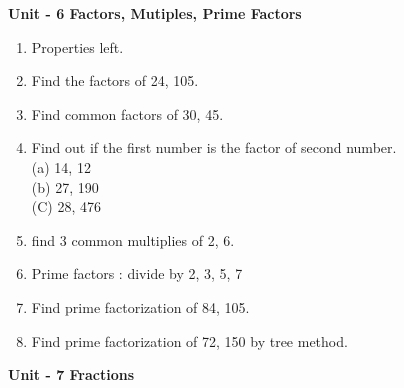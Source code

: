 \newpage \centerline{\textbf{ \LARGE  Unit - 6 \quad Factors, Mutiples, Prime Factors }}

\begin{enumerate}

    \item Properties left.

    \item Find the factors of 24, 105.

    \item Find common factors of 30, 45.

    \item Find out if the first number is the factor of second number.
            \\(a) 14, 12 \\(b) 27, 190 \\(C) 28, 476

    \item find 3 common multiplies of 2, 6.

    \item Prime factors : divide by 2, 3, 5, 7

    \item Find prime factorization of 84, 105.

    \item Find prime factorization of 72, 150  by tree method.

\end{enumerate}


\newpage \centerline{\textbf{ \LARGE  Unit - 7 \quad Fractions }}

